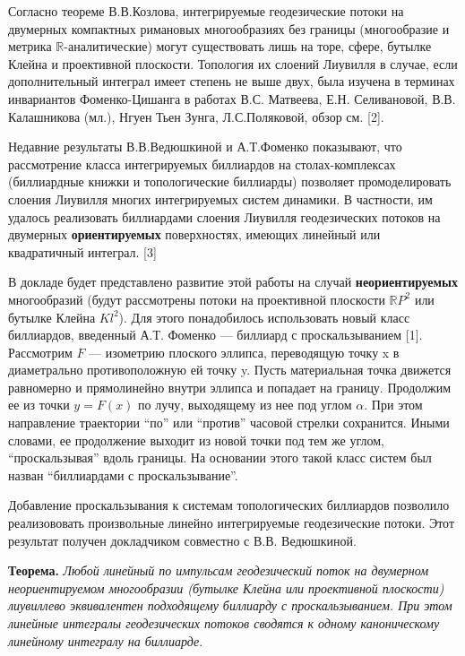 \documentclass{vzmsthesis}
\begin{document}

\vzmscaption
Согласно теореме В.В.Козлова, интегрируемые геодезические потоки на двумерных компактных римановых многообразиях без границы (многообразие и метрика $\mathbb{R}$-аналитические) могут существовать лишь на торе, сфере, бутылке Клейна и проективной плоскости. Топология их слоений Лиувилля в случае, если дополнительный интеграл имеет степень не выше двух, была изучена в терминах инвариантов Фоменко-Цишанга в работах В.С. Матвеева, Е.Н. Селивановой, В.В. Калашникова (мл.), Нгуен Тьен Зунга, Л.С.Поляковой, обзор см. [2].

Недавние результаты В.В.Ведюшкиной и А.Т.Фоменко показывают, что рассмотрение класса интегрируемых биллиардов на столах-комплексах (биллиардные книжки и топологические биллиарды) позволяет промоделировать слоения Лиувилля многих интегрируемых систем динамики. В частности, им удалось реализовать биллиардами слоения Лиувилля геодезических потоков на двумерных \textbf{ориентируемых} поверхностях, имеющих линейный или квадратичный интеграл. [3]

В докладе будет представлено развитие этой работы на случай \textbf{неориентируемых} многообразий (будут рассмотрены потоки на проективной плоскости $\mathbb{R}P^2$ или бутылке Клейна $Kl^2$). Для этого понадобилось использовать новый класс биллиардов, введенный А.Т. Фоменко — биллиард с проскальзыванием [1]. Рассмотрим $F$ --- изометрию плоского эллипса, переводящую точку x в диаметрально противоположную ей точку y. Пусть материальная точка движется равномерно и прямолинейно внутри эллипса и попадает на границу. Продолжим ее из точки $y=F(x)$ по лучу, выходящему из нее под углом $\alpha$. При этом направление траектории ``по'' или ``против'' часовой стрелки сохранится. Иными словами, ее продолжение выходит из новой точки под тем же углом, ``проскальзывая'' вдоль границы. На основании этого такой класс систем был назван ``биллиардами с проскальзывание''.

Добавление проскальзывания к системам топологических биллиардов позволило реализововать произвольные линейно интегрируемые геодезические потоки. Этот результат получен докладчиком совместно с В.В. Ведюшкиной.

{\bf Теорема.} {\it Любой линейный по импульсам геодезический поток на двумерном неориентируемом многообразии (бутылке Клейна или проективной плоскости) лиувиллево эквивалентен подходящему биллиарду с проскальзыванием. При этом линейные интегралы геодезических потоков сводятся к одному каноническому линейному интегралу на биллиарде}.
\end{document}
